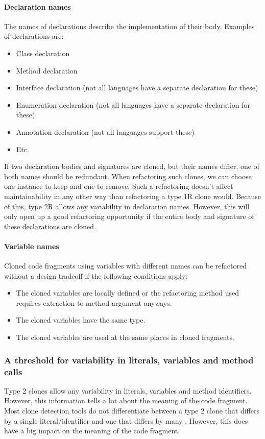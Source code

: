 \paragraph{Declaration names}
The names of declarations describe the implementation of their body. Examples of declarations are:
\begin{itemize}
  \item Class declaration
  \item Method declaration
  \item Interface declaration (not all languages have a separate declaration for these)
  \item Enumeration declaration (not all languages have a separate declaration for these)
  \item Annotation declaration (not all languages support these)
  \item Etc.
\end{itemize}
If two declaration bodies and signatures are cloned, but their names differ, one of both names should be redundant. When refactoring such clones, we can choose one instance to keep and one to remove. Such a refactoring doesn't affect maintainability in any other way than refactoring a type 1R clone would. Because of this, type 2R allows any variability in declaration names. However, this will only open up a good refactoring opportunity if the entire body and signature of these declarations are cloned.

\paragraph{Variable names}
Cloned code fragments using variables with different names can be refactored without a design tradeoff if the following conditions apply:

\begin{itemize}
  \item The cloned variables are locally defined or the refactoring method used requires extraction to method argument anyways.
  \item The cloned variables have the same type.
  \item The cloned variables are used at the same places in cloned fragments.
\end{itemize}


\subsubsection{A threshold for variability in literals, variables and method calls}\label{sec:variabilitythreshold}
Type 2 clones allow any variability in literals, variables and method identifiers. However, this information tells a lot about the meaning of the code fragment. Most clone detection tools do not differentiate between a type 2 clone that differs by a single literal/identifier and one that differs by many \cite{roy2009comparison}. However, this does have a big impact on the meaning of the code fragment.


